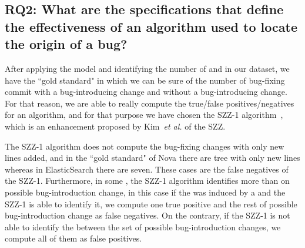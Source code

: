 \documentclass[a4paper, 12pt]{book}
\begin{document}

\vspace{0.2cm}
\vspace{0.1cm}

\subsection{ RQ2: What are the specifications that define the effectiveness of an algorithm used to locate the origin of a bug? }
After applying the model and identifying the number of \BIC and \FFC in our dataset, we have the ``gold standard" in which we can be sure of the number of bug-fixing commit with a bug-introducing change and without a bug-introducing change. For that reason, we are able to really compute the true/false positives/negatives for an algorithm, and for that purpose we have chosen the SZZ-1 algorithm~\cite{kim2008classifying}, which is an enhancement proposed by Kim~\textit{et al.} of the SZZ. 

The SZZ-1 algorithm does not compute the bug-fixing changes with only new lines added, and in the ``gold standard" of Nova there are tree \BFC with only new lines whereas in ElasticSearch there are seven. These cases are the false negatives of the SZZ-1. Furthermore, in some \BFC, the SZZ-1 algorithm identifies more than on possible bug-introduction change, in this case if the \BFC was induced by a \BIC and the SZZ-1 is able to identify it, we compute one true positive and the rest of possible bug-introduction change as false negatives. On the contrary, if the SZZ-1 is not able to identify the \BIC between the set of possible bug-introduction changes, we compute all of them as false positives.  
\end{document}
